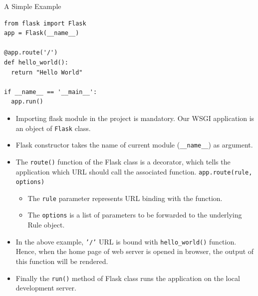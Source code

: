 \documentclass[aspectratio=169, xcolor=dvipsnames]{beamer}
\begin{document}
\begin{frame}[fragile]{A Simple Example}
    \begin{verbatim}
from flask import Flask
app = Flask(__name__)

@app.route('/')
def hello_world():
  return "Hello World"

if __name__ == '__main__':
  app.run()
    \end{verbatim}
    \begin{itemize}
        \item Importing flask module in the project is mandatory. Our WSGI application is an object of \texttt{Flask} class.
        \item Flask constructor takes the name of current module (\texttt{\_\_name\_\_}) as argument.
        \item The \texttt{route()} function of the Flask class is a decorator, which tells the application which URL should call the associated function. \texttt{app.route(rule, options)}
        \begin{itemize}
            \item The \texttt{rule} parameter represents URL binding with the function.
            \item The \texttt{options} is a list of parameters to be forwarded to the underlying Rule object.
        \end{itemize}
        \item In the above example, \texttt{'/'} URL is bound with \texttt{hello\_world()} function. Hence, when the home page of web server is opened in browser, the output of this function will be rendered.
        \item Finally the \texttt{run()} method of Flask class runs the application on the local development server.
    \end{itemize}
\end{frame}
\end{document}

